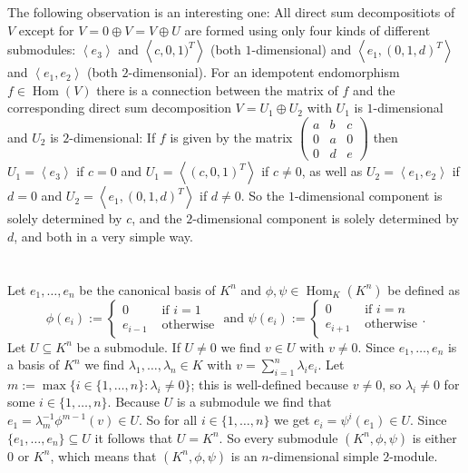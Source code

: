 \documentclass[a4paper,10pt]{article}
\newcommand{\Hom}{\operatorname{Hom}}
\newcommand{\gen}[1]{\left\langle#1\right\rangle}
\newcommand{\vect}[1]{\begin{pmatrix}#1\end{pmatrix}}
\begin{document}
The following observation is an interesting one: All direct sum decompositiots of $V$ except for $V = 0 \oplus V = V \oplus U$ are formed using only four kinds of different submodules: $\gen{e_3}$ and $\gen{c,0,1)^T}$ (both $1$-dimensional) and $\gen{e_1,(0,1,d)^T}$ and $\gen{e_1,e_2}$ (both $2$-dimensonial). For an idempotent endomorphism $f \in \Hom(V)$ there is a connection between the matrix of $f$ and the corresponding direct sum decomposition $V = U_1 \oplus U_2$ with $U_1$ is $1$-dimensional and $U_2$ is $2$-dimensional: If $f$ is given by the matrix $\vect{a&b&c\\0&a&0\\0&d&e}$ then $U_1 = \gen{e_3}$ if $c=0$ and $U_1 = \gen{(c,0,1)^T}$ if $c \neq 0$, as well as $U_2 = \gen{e_1, e_2}$ if $d = 0$ and $U_2 = \gen{e_1, (0,1,d)^T}$ if $d \neq 0$. So the $1$-dimensional component is solely determined by $c$, and the $2$-dimensional component is solely determined by $d$, and both in a very simple way.









\addtocounter{section}{1}
\section{}
Let $e_1, \ldots, e_n$ be the canonical basis of $K^n$ and $\phi, \psi \in \Hom_{K}(K^n)$ be defined as
\[
 \phi(e_i) :=
 \begin{cases}
  0       & \text{ if } i=1 \\
  e_{i-1} & \text{ otherwise}
 \end{cases}
 \text{ and }
 \psi(e_i) :=
 \begin{cases}
        0 & \text{ if } i=n \\
  e_{i+1} & \text{ otherwise}
 \end{cases}.
\]
Let $U \subseteq K^n$ be a submodule. If $U \neq 0$ we find $v \in U$ with $v \neq 0$. Since $e_1, \ldots, e_n$ is a basis of $K^n$ we find $\lambda_1, \ldots, \lambda_n \in K$ with $v = \sum_{i=1}^n \lambda_i e_i$. Let $m := \max \{i \in \{1, \ldots, n\} : \lambda_i \neq 0\}$; this is well-defined because $v \neq 0$, so $\lambda_i \neq 0$ for some $i \in \{1, \ldots, n\}$. Because $U$ is a submodule we find that $e_1 = \lambda_m^{-1} \phi^{m-1}(v) \in U$. So for all $i \in \{1, \ldots, n\}$ we get $e_i = \psi^i(e_1) \in U$. Since $\{e_1, \ldots, e_n\} \subseteq U$ it follows that $U = K^n$. So every submodule $(K^n, \phi, \psi)$ is either $0$ or $K^n$, which means that $(K^n,\phi,\psi)$ is an $n$-dimensional simple $2$-module.
\end{document}
